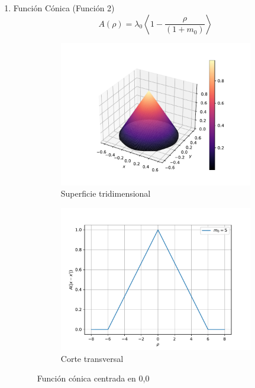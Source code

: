 \begin{enumerate}
	\item Función Cónica (Función 2)
	\begin{equation}
		A(\rho)=\lambda_0\left<1-\frac{\rho}{(1+m_0)}\right>
	\end{equation}
	\begin{figure}
	    \centering
	    \sffamily
	    \begin{subfigure}{0.45\textwidth}
	    \centering
	        \includegraphics[width=\textwidth]{figuras/conica3d.pdf}
	        \caption{Superficie tridimensional}
	        \label{fig:conica.3d}
	    \end{subfigure}
	    \begin{subfigure}{0.45\textwidth}
	    \centering
	        \includegraphics[width=\textwidth]{figuras/conica2d.pdf}
	        \caption{Corte transversal}
	        \label{fig:conica.2d}
	    \end{subfigure}
	    \caption{Función cónica centrada en 0,0}
	    \label{fig:conica}
	\end{figure}


\end{enumerate}
